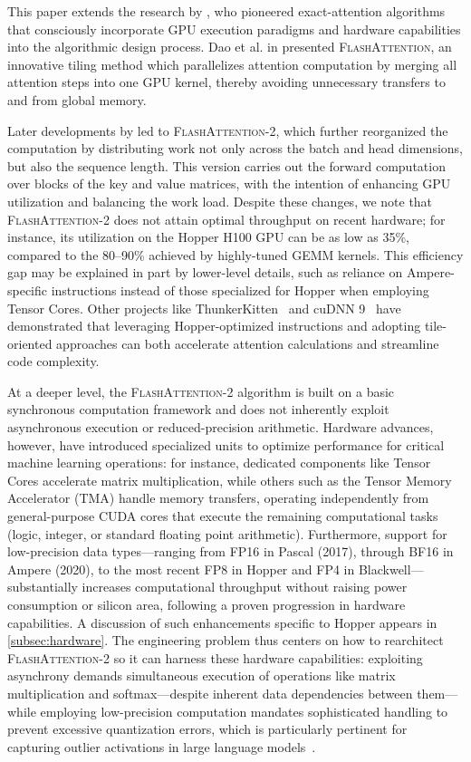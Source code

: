 This paper extends the research by \citet{dao2022flashattention}, who pioneered exact-attention algorithms that consciously incorporate GPU execution paradigms and hardware capabilities into the algorithmic design process. Dao et al. in \citep{dao2022flashattention} presented \textsc{FlashAttention}, an innovative tiling method which parallelizes attention computation by merging all attention steps into one GPU kernel, thereby avoiding unnecessary transfers to and from global memory.

Later developments by \citet{dao2023flashattention2} led to \textsc{FlashAttention-2}, which further reorganized the computation by distributing work not only across the batch and head dimensions, but also the sequence length. This version carries out the forward computation over blocks of the key and value matrices, with the intention of enhancing GPU utilization and balancing the work load. Despite these changes, we note that \textsc{FlashAttention-2} does not attain optimal throughput on recent hardware; for instance, its utilization on the Hopper H100 GPU can be as low as 35\%, compared to the 80–90\% achieved by highly-tuned GEMM kernels. This efficiency gap may be explained in part by lower-level details, such as reliance on Ampere-specific instructions instead of those specialized for Hopper when employing Tensor Cores. Other projects like ThunkerKitten~\citep{spector2024thunder} and cuDNN 9~\citep{cudnn9} have demonstrated that leveraging Hopper-optimized instructions and adopting tile-oriented approaches can both accelerate attention calculations and streamline code complexity.

At a deeper level, the \textsc{FlashAttention-2} algorithm is built on a basic synchronous computation framework and does not inherently exploit asynchronous execution or reduced-precision arithmetic. Hardware advances, however, have introduced specialized units to optimize performance for critical machine learning operations: for instance, dedicated components like Tensor Cores accelerate matrix multiplication, while others such as the Tensor Memory Accelerator (TMA) handle memory transfers, operating independently from general-purpose CUDA cores that execute the remaining computational tasks (logic, integer, or standard floating point arithmetic). Furthermore, support for low-precision data types—ranging from FP16 in Pascal (2017), through BF16 in Ampere (2020), to the most recent FP8 in Hopper and FP4 in Blackwell—substantially increases computational throughput without raising power consumption or silicon area, following a proven progression in hardware capabilities. A discussion of such enhancements specific to Hopper appears in \cref{subsec:hardware}.  
The engineering problem thus centers on how to rearchitect \textsc{FlashAttention-2} so it can harness these hardware capabilities: exploiting asynchrony demands simultaneous execution of operations like matrix multiplication and softmax—despite inherent data dependencies between them—while employing low-precision computation mandates sophisticated handling to prevent excessive quantization errors, which is particularly pertinent for capturing outlier activations in large language models~\citep{dettmers2208llm, sun2024massive}.

